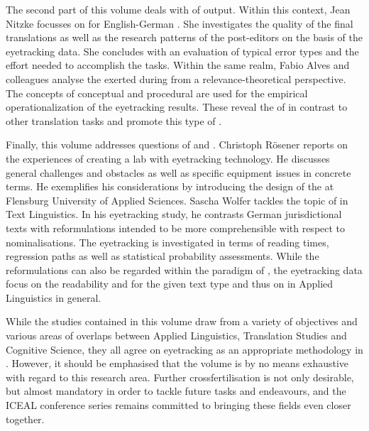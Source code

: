 \documentclass[output=paper]{langsci/langscibook}
\begin{document}
The second part of this volume deals with  of  output. Within this context, Jean Nitzke focusses on  for English-German . She investigates the quality of the final translations as well as the research patterns of the post-editors on the basis of the eyetracking data. She concludes with an evaluation of typical error types and the effort needed to accomplish the  tasks. Within the same realm, Fabio Alves and colleagues analyse the  exerted during  from a relevance-theoretical perspective. The concepts of conceptual and procedural  are used for the empirical operationalization of the eyetracking results. These reveal the  of  in contrast to other translation tasks and promote this type of .

\largerpage
Finally, this volume addresses questions of  and . Christoph Rösener reports on the experiences of creating a  lab with eyetracking technology. He discusses general challenges and obstacles as well as specific equipment issues in concrete terms. He exemplifies his considerations by introducing the design of the  at Flensburg University of Applied Sciences. Sascha Wolfer tackles the topic of  in Text Linguistics. In his eyetracking study, he contrasts German jurisdictional texts with reformulations intended to be more comprehensible with respect to nominalisations. The eyetracking  is investigated in terms of reading times, regression paths as well as statistical probability assessments. While the reformulations can also be regarded within the paradigm of , the eyetracking data focus on the readability and  for the given text type and thus on  in Applied Linguistics in general.

While the studies contained in this volume draw from a variety of objectives and various areas of overlaps between Applied Linguistics, Translation Studies and Cognitive Science, they all agree on eyetracking as an appropriate methodology in . However, it should be emphasised that the volume is by no means exhaustive with regard to this research area. Further crossfertilisation is not only desirable, but almost mandatory in order to tackle future tasks and endeavours, and the ICEAL conference series remains committed to bringing these fields even closer together.
\end{document}
